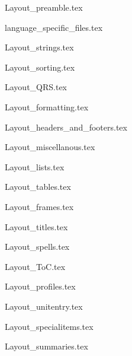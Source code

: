 
{Layout_preamble.tex}


{language_specific_files.tex}



{Layout_strings.tex}



{Layout_sorting.tex}



{Layout_QRS.tex}



{Layout_formatting.tex}



{Layout_headers_and_footers.tex}



{Layout_miscellanous.tex}



{Layout_lists.tex}



{Layout_tables.tex}



{Layout_frames.tex}



{Layout_titles.tex}



{Layout_spells.tex}



{Layout_ToC.tex}



{Layout_profiles.tex}



{Layout_unitentry.tex}


{Layout_specialitems.tex}



{Layout_summaries.tex}
